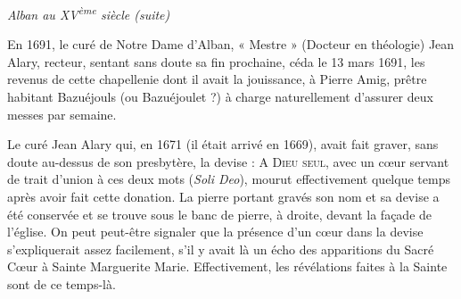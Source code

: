 
\begin{center}
    {\Large\itshape Alban au XV\textsuperscript{ème} siècle (suite)}
\end{center}

\vspace{1.5em}

En 1691, le curé de Notre Dame d'Alban, « Mestre » (Docteur en
théologie) Jean Alary, recteur, sentant sans doute sa fin prochaine,
céda le 13 mars 1691, les revenus de cette chapellenie dont il avait la
jouissance, à Pierre Amig, prêtre habitant Bazuéjouls (ou Bazuéjoulet ?)
à charge naturellement d'assurer deux messes par semaine.

\medskip

Le curé Jean Alary qui, en 1671 (il était arrivé en 1669), avait fait
graver, sans doute au-dessus de son presbytère, la devise : \textsc{A Dieu
seul}, avec un cœur servant de trait d'union à ces deux mots (\textit{Soli
Deo}), mourut effectivement quelque temps après avoir fait cette
donation. La pierre portant gravés son nom et sa devise a été conservée
et se trouve sous le banc de pierre, à droite, devant la façade de
l'église. On peut peut-être signaler que la présence d'un cœur dans la
devise s'expliquerait assez facilement, s'il y avait là un écho des
apparitions du Sacré Cœur à Sainte Marguerite Marie. Effectivement, les
révélations faites à la Sainte sont de ce temps-là.
